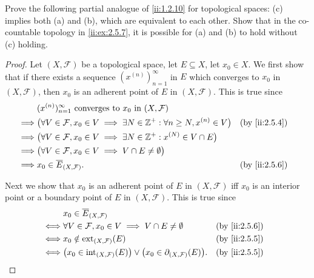 \begin{ex}\label{ii:ex:2.5.10}
  Prove the following partial analogue of \cref{ii:1.2.10} for topological spaces:
  (c) implies both (a) and (b), which are equivalent to each other.
  Show that in the co-countable topology in \cref{ii:ex:2.5.7}, it is possible for (a) and (b) to hold without (c) holding.
\end{ex}

\begin{proof}
  Let \((X, \mathcal{F})\) be a topological space, let \(E \subseteq X\), let \(x_0 \in X\).
  We first show that if there exists a sequence \((x^{(n)})_{n = 1}^\infty\) in \(E\) which converges to \(x_0\) in \((X, \mathcal{F})\), then \(x_0\) is an adherent point of \(E\) in \((X, \mathcal{F})\).
  This is true since
  \begin{align*}
             & (x^{(n)})_{n = 1}^\infty \text{ converges to } x_0 \text{ in } (X, \mathcal{F})                                                 \\
    \implies & \big(\forall V \in \mathcal{F}, x_0 \in V \implies \exists N \in \Z^+ : \forall n \geq N, x^{(n)} \in V\big) &  & \by{ii:2.5.4} \\
    \implies & \big(\forall V \in \mathcal{F}, x_0 \in V \implies \exists N \in \Z^+ : x^{(N)} \in V \cap E\big)                               \\
    \implies & \big(\forall V \in \mathcal{F}, x_0 \in V \implies V \cap E \neq \emptyset\big)                                                 \\
    \implies & x_0 \in \overline{E}_{(X, \mathcal{F})}.                                                                     &  & \by{ii:2.5.6}
  \end{align*}

  Next we show that \(x_0\) is an adherent point of \(E\) in \((X, \mathcal{F})\) iff \(x_0\) is an interior point or a boundary point of \(E\) in \((X, \mathcal{F})\).
  This is true since
  \begin{align*}
         & x_0 \in \overline{E}_{(X, \mathcal{F})}                                                                                      \\
    \iff & \forall V \in \mathcal{F}, x_0 \in V \implies V \cap E \neq \emptyset                                     &  & \by{ii:2.5.6} \\
    \iff & x_0 \notin \text{ext}_{(X, \mathcal{F})}(E)                                                               &  & \by{ii:2.5.5} \\
    \iff & \big(x_0 \in \text{int}_{(X, \mathcal{F})}(E)\big) \lor \big(x_0 \in \partial_{(X, \mathcal{F})}(E)\big). &  & \by{ii:2.5.5}
  \end{align*}


\end{proof}
